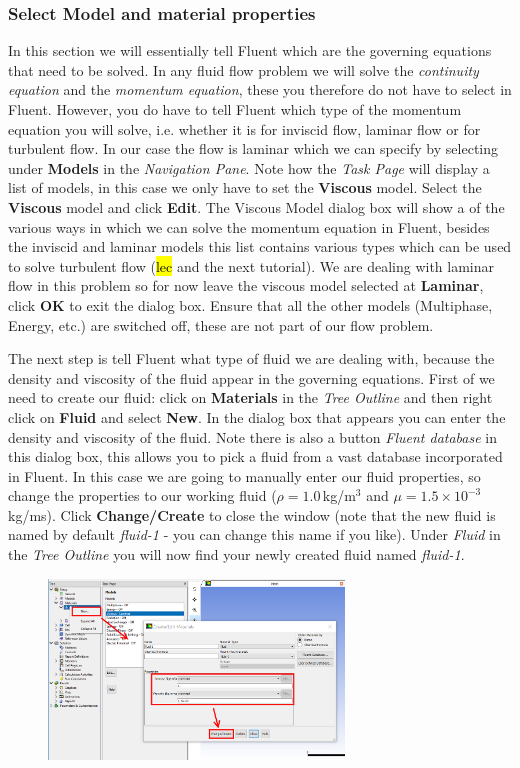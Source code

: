\documentclass[11pt,a4paper,oneside,hidelinks]{scrartcl}
\newcommand\bfr[1]{\textcolor[rgb]{1,0.00,0.00}{\textbf{\textsf{#1}}}}
\begin{document}
\subsubsection{Select Model and material properties}
In this section we will essentially tell Fluent which are the governing equations that need to be solved. In any fluid flow problem we will solve the \emph{continuity equation} and the \emph{momentum equation}, these you therefore do not have to select in Fluent. However, you do have to tell Fluent which type of the momentum equation you will solve, i.e. whether it is for inviscid flow, laminar flow or for turbulent flow. In our case the flow is laminar which we can specify by selecting under \bfr{Models} in the \emph{Navigation Pane}. Note how the \emph{Task Page} will display a list of models, in this case we only have to set the \bfr{Viscous} model. Select the \bfr{Viscous} model and click \bfr{Edit}. The Viscous Model dialog box will show a of the various ways in which we can solve the momentum equation in Fluent, besides the inviscid and laminar models this list contains various types which can be used to solve turbulent flow (\hl{lec} and the next tutorial). We are dealing with laminar flow in this problem so for now leave the viscous model selected at \bfr{Laminar}, click \bfr{OK} to exit the dialog box. Ensure that all the other models (Multiphase, Energy, etc.) are switched off, these are not part of our flow problem.

The next step is tell Fluent what type of fluid we are dealing with, because the density and viscosity of the fluid appear in the governing equations.
First of we need to create our fluid: click on \bfr{Materials} in the \emph{Tree Outline} and then right click on  \bfr{Fluid} and select \bfr{New}.  In the dialog box that appears you can enter the density and viscosity of the fluid.  Note there is also a button \emph{Fluent database} in this dialog box, this allows you to pick a fluid from a vast database incorporated in Fluent. In this case we are going to manually enter our fluid properties, so change the properties to our working fluid ($\rho=1.0$\,kg/m$^3$ and $\mu=1.5\times10^{-3}$\,kg/ms). Click \bfr{Change/Create} to close the window (note that the new fluid is named by default \emph{fluid-1} - you can change this name if you like). Under \emph{Fluid} in the \emph{Tree Outline} you will now find your newly created fluid named \emph{fluid-1}.

\begin{figure}[H]
\begin{center}
\includegraphics[width=0.7\textwidth,clip]{fluid_properties.png}
\end{center}
\end{figure}
\end{document}
